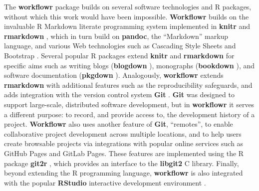 \documentclass[9pt,a4paper]{extarticle}
\begin{document}
The \textbf{workflowr} package builds on several software technologies and R
packages, without which this work would have been impossible. \textbf{Workflowr}
builds on the invaluable R Markdown literate programming system
implemented in \textbf{knitr} \cite{Xie2014, knitrpkg} and \textbf{rmarkdown}
\cite{Xie2018, rmarkdownpkg}, which in turn build on \textbf{pandoc}, the
``Markdown'' markup language, and various Web technologies such as
Cascading Style Sheets and Bootstrap \cite{Spurlock2013}. Several
popular R packages extend \textbf{knitr} and \textbf{rmarkdown} for specific aims such as
writing blogs  (\textbf{blogdown} \cite{blogdown}), monographs  (\textbf{bookdown}
\cite{bookdown}), and software documentation  (\textbf{pkgdown} \cite{pkgdown}).
Analogously, \textbf{workflowr} extends \textbf{rmarkdown} with additional features such
as the reproducibility safeguards, and adds integration with the version
control system \textbf{Git} \cite{Loeliger2012, Chacon2014}. \textbf{Git} was designed to
support large-scale, distributed software development, but in \textbf{workflowr}
it serves a different purpose: to record, and provide access to, the
development history of a project. \textbf{Workflowr} also uses another feature of
 \textbf{Git}, ``remotes'', to enable collaborative project development across
multiple locations, and to help users create browsable projects via
integrations with popular online services such as GitHub Pages and
GitLab Pages. These features are implemented using the R package \textbf{git2r}
\cite{git2r}, which provides an interface to the \textbf{libgit2} C library.
Finally, beyond extending the R programming language, \textbf{workflowr} is also
integrated with the popular \textbf{RStudio} interactive development environment
\cite{rstudio}.
\end{document}
